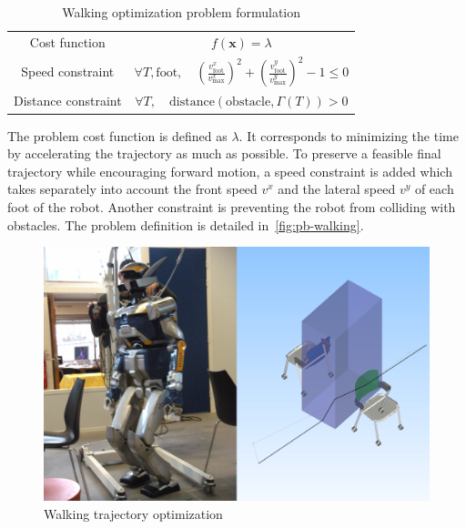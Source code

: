 \documentclass[conference,final,a4paper,twocolumn,9pt]{IEEEtran}
\begin{document}
\begin{table}[ht!]
  \begin{center}
    \begin{tabular}{|c|c|}
      \hline Cost function & $f(\mathbf{x}) = \lambda$\\ Speed
      constraint & $\forall T, \text{foot},\quad
      (\frac{v_{\text{foot}}^{x}}{v_{\text{max}}^{x}})^2 +
      (\frac{v_{\text{foot}}^{y}}{v_{\text{max}}^{y}})^2 - 1 \leq
      0$\\ Distance constraint & $\forall T,\quad\text{distance} (\text{obstacle},
      \Gamma (T)) > 0$\\ \hline
    \end{tabular}
    \caption{Walking optimization problem formulation\label{fig:pb-walking}}
  \end{center}
\end{table}


The problem cost function is defined as $\lambda$. It corresponds to
minimizing the time by accelerating the trajectory as much as
possible. To preserve a feasible final trajectory while encouraging
forward motion, a speed constraint is added which takes separately
into account the front speed $v^x$ and the lateral speed $v^y$ of each
foot of the robot. Another constraint is preventing the robot from
colliding with obstacles. The problem definition is detailed
in~\autoref{fig:pb-walking}.


\begin{figure}[ht!]
  \begin{center}
    \includegraphics[width=\linewidth]{hrp2-two-chairs.png}
    \caption{Walking trajectory optimization\label{fig:result-walking}}
  \end{center}
\end{figure}
\end{document}
